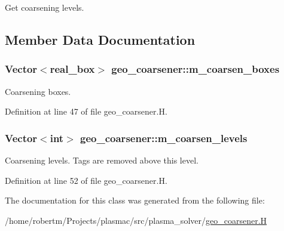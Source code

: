 Get coarsening levels. 



\subsection{Member Data Documentation}
\subsubsection[{\texorpdfstring{m\+\_\+coarsen\+\_\+boxes}{m_coarsen_boxes}}]{\setlength{\rightskip}{0pt plus 5cm}Vector$<${\bf real\+\_\+box}$>$ geo\+\_\+coarsener\+::m\+\_\+coarsen\+\_\+boxes\hspace{0.3cm}{\ttfamily [protected]}}\hypertarget{classgeo__coarsener_a8fd74835e9e8f6f738189431a02f92a4}{}\label{classgeo__coarsener_a8fd74835e9e8f6f738189431a02f92a4}


Coarsening boxes. 



Definition at line 47 of file geo\+\_\+coarsener.\+H.

\subsubsection[{\texorpdfstring{m\+\_\+coarsen\+\_\+levels}{m_coarsen_levels}}]{\setlength{\rightskip}{0pt plus 5cm}Vector$<$int$>$ geo\+\_\+coarsener\+::m\+\_\+coarsen\+\_\+levels\hspace{0.3cm}{\ttfamily [protected]}}\hypertarget{classgeo__coarsener_a4c9640764f04393730f5fba8cc671e08}{}\label{classgeo__coarsener_a4c9640764f04393730f5fba8cc671e08}


Coarsening levels. Tags are removed above this level. 



Definition at line 52 of file geo\+\_\+coarsener.\+H.



The documentation for this class was generated from the following file\+:\begin{DoxyCompactItemize}
\item 
/home/robertm/\+Projects/plasmac/src/plasma\+\_\+solver/\hyperlink{geo__coarsener_8H}{geo\+\_\+coarsener.\+H}\end{DoxyCompactItemize}
